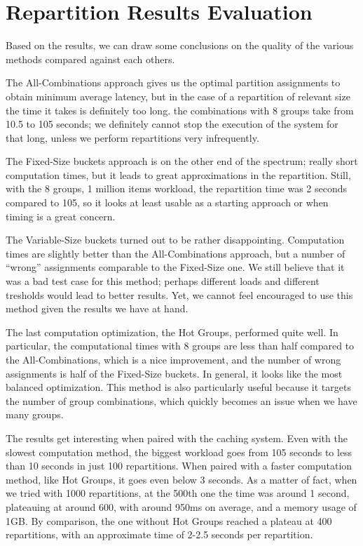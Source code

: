 \section{Repartition Results Evaluation}\label{sec:repartition-results-evaluation}
Based on the results, we can draw some conclusions on the quality of the various methods compared against each others. 

The All-Combinations approach gives us the optimal partition assignments to obtain minimum average latency, but in the case of a repartition of relevant size the time it takes is definitely too long. the combinations with 8 groups take from 10.5 to 105 seconds; we definitely cannot stop the execution of the system for that long, unless we perform repartitions very infrequently.

The Fixed-Size buckets approach is on the other end of the spectrum; really short computation times, but it leads to great approximations in the repartition. Still, with the 8 groups, 1 million items workload, the repartition time was 2 seconds compared to 105, so it looks at least usable as a starting approach or when timing is a great concern.

The Variable-Size buckets turned out to be rather disappointing. Computation times are slightly better than the All-Combinations approach, but a number of ``wrong'' assignments comparable to the Fixed-Size one. We still believe that it was a bad test case for this method; perhaps different loads and different tresholds would lead to better results. Yet, we cannot feel encouraged to use this method given the results we have at hand.

The last computation optimization, the Hot Groups, performed quite well. In particular, the computational times with 8 groups are less than half compared to the All-Combinations, which is a nice improvement, and the number of wrong assignments is half of the Fixed-Size buckets. In general, it looks like the most balanced optimization. This method is also particularly useful because it targets the number of group combinations, which quickly becomes an issue when we have many groups.

The results get interesting when paired with the caching system. Even with the slowest computation method, the biggest workload goes from 105 seconds to less than 10 seconds in just 100 repartitions. When paired with a faster computation method, like Hot Groups, it goes even below 3 seconds. As a matter of fact, when we tried with 1000 repartitions, at the 500th one the time was around 1 second, plateauing at around 600, with around 950ms on average, and a memory usage of 1GB.
By comparison, the one without Hot Groups reached a plateau at 400 repartitions, with an approximate time of 2-2.5 seconds per repartition.


